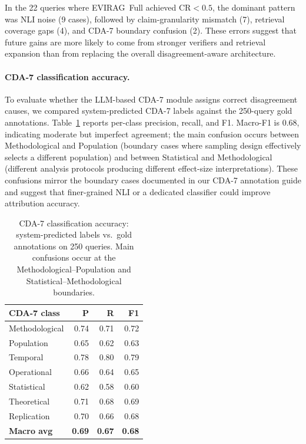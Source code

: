 \documentclass[11pt]{article}
\newcommand{\system}{\textsc{EVIRAG}\xspace}
\begin{document}
In the 22 queries where \system\ Full achieved CR$<0.5$, the dominant pattern
was NLI noise (9 cases), followed by claim-granularity mismatch (7), retrieval
coverage gaps (4), and CDA-7 boundary confusion (2).  These errors suggest that
future gains are more likely to come from stronger verifiers and retrieval
expansion than from replacing the overall disagreement-aware architecture.

\paragraph{CDA-7 classification accuracy.}
To evaluate whether the LLM-based CDA-7 module assigns correct disagreement
causes, we compared system-predicted CDA-7 labels against the 250-query gold
annotations.  Table~\ref{tab:cda7acc} reports per-class precision, recall, and
F1.  Macro-F1 is $0.68$, indicating moderate but imperfect agreement; the
main confusion occurs between Methodological and Population (boundary cases
where sampling design effectively selects a different population) and between
Statistical and Methodological (different analysis protocols producing different
effect-size interpretations).  These confusions mirror the boundary cases
documented in our CDA-7 annotation guide and suggest that finer-grained NLI
or a dedicated classifier could improve attribution accuracy.

\begin{table}[!htbp]
\centering\small
\setlength{\tabcolsep}{4pt}
\begin{tabular}{@{}lrrr@{}}
\toprule
\textbf{CDA-7 class} & \textbf{P} & \textbf{R} & \textbf{F1} \\
\midrule
Methodological & 0.74 & 0.71 & 0.72 \\
Population     & 0.65 & 0.62 & 0.63 \\
Temporal       & 0.78 & 0.80 & 0.79 \\
Operational    & 0.66 & 0.64 & 0.65 \\
Statistical    & 0.62 & 0.58 & 0.60 \\
Theoretical    & 0.71 & 0.68 & 0.69 \\
Replication    & 0.70 & 0.66 & 0.68 \\
\midrule
\textbf{Macro avg} & \textbf{0.69} & \textbf{0.67} & \textbf{0.68} \\
\bottomrule
\end{tabular}
\caption{CDA-7 classification accuracy: system-predicted labels vs.\ gold
annotations on 250 queries.  Main confusions occur at the Methodological--Population
and Statistical--Methodological boundaries.}
\label{tab:cda7acc}
\end{table}
\end{document}
